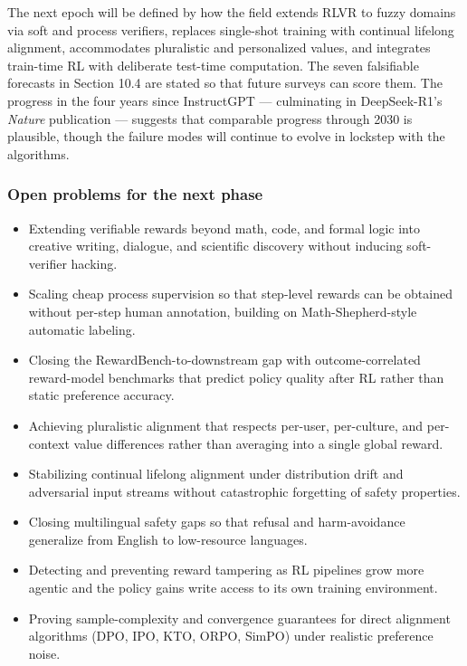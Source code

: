 \documentclass{article}
\begin{document}
The next epoch will be defined by how the field extends RLVR to fuzzy domains via soft and process verifiers, replaces single-shot training with continual lifelong alignment, accommodates pluralistic and personalized values, and integrates train-time RL with deliberate test-time computation. The seven falsifiable forecasts in Section 10.4 are stated so that future surveys can score them. The progress in the four years since InstructGPT --- culminating in DeepSeek-R1's \emph{Nature} publication --- suggests that comparable progress through 2030 is plausible, though the failure modes will continue to evolve in lockstep with the algorithms.

\subsubsection{Open problems for the next phase}\label{open-problems-for-the-next-phase}

\begin{itemize}

\item
  Extending verifiable rewards beyond math, code, and formal logic into creative writing, dialogue, and scientific discovery without inducing soft-verifier hacking.
\item
  Scaling cheap process supervision so that step-level rewards can be obtained without per-step human annotation, building on Math-Shepherd-style automatic labeling.
\item
  Closing the RewardBench-to-downstream gap with outcome-correlated reward-model benchmarks that predict policy quality after RL rather than static preference accuracy.
\item
  Achieving pluralistic alignment that respects per-user, per-culture, and per-context value differences rather than averaging into a single global reward.
\item
  Stabilizing continual lifelong alignment under distribution drift and adversarial input streams without catastrophic forgetting of safety properties.
\item
  Closing multilingual safety gaps so that refusal and harm-avoidance generalize from English to low-resource languages.
\item
  Detecting and preventing reward tampering as RL pipelines grow more agentic and the policy gains write access to its own training environment.
\item
  Proving sample-complexity and convergence guarantees for direct alignment algorithms (DPO, IPO, KTO, ORPO, SimPO) under realistic preference noise.
\end{itemize}
\end{document}
